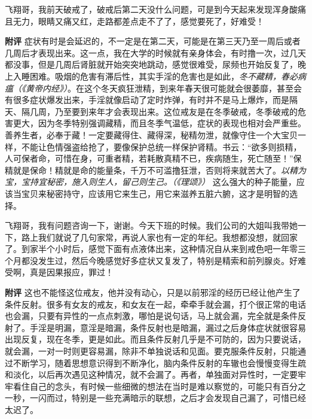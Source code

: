 \begin{case}
    飞翔哥，我前天破戒了，破戒后第二天没什么问题，可是到今天起来发现浑身酸痛且无力，眼睛又痛又红，走路都差点走不了了，感觉要死了，好难受！

    \textbf{附评} 症状有时是会延迟的，不一定是在第二天，可能是在第三天乃至一周后或者几周后才表现出来。这一点，我在大学的时候就有亲身体会，有时撸一次，过几天都没事，但是几周后肾脏就开始突突地跳动，感觉很难受，尿频也开始反复了，晚上入睡困难。吸烟的危害有滞后性，其实手淫的危害也是如此，\textit{冬不藏精，春必病瘟（《黄帝内经》）}。在这个冬天疯狂泄精，到来年春天很可能就会很萎靡，甚至会有很多症状爆发出来，手淫就像启动了定时炸弹，有时并不是马上爆炸，而是隔天、隔几周，乃至要到来年才会表现出来。这位戒友是在冬季破戒，冬季破戒的危害更大，因为冬季特别强调藏精，而且冬季气温低，症状的表现也相对会严重些。善养生者，必奉于藏！一定要藏得住、藏得深，秘精勿泄，就像守住一个大宝贝一样，不能让色情强盗给抢了，要像保护总统一样保护肾精。书云：“欲多则损精，人可保者命，可惜在身，可重者精，若耗散真精不已，疾病随生，死亡随至！”保精就是保命！精就是命的能量条，千万不可滥撸狂泄，否则将来就苦大了。\textit{以精为宝，宝持宜秘密，施入则生人，留己则生己。（《理颂》）} 这么强大的种子能量，应该当宝贝来秘密持守，应该用它来生己，用它来滋养五脏六腑，这才是明智的选择。
\end{case}

\begin{case}
    飞翔哥，我有问题咨询一下，谢谢。今天下班的时候。我们公司的大姐叫我带她一下，路上我们就说了几句家常，再说人家也有一定的年纪。我想都没想，就回家了。到家半个小时后，感觉下面有点液体出来，这种情况自从来到戒色吧一年零三个月都没发生过，然后今晚感觉好多症状又复发了，特别是精索和前列腺炎。好难受啊，真是因果报应，罪过！

    \textbf{附评} 这也不能怪这位戒友，他并没有动心，只是以前邪淫的经历已经让他产生了条件反射。很多有女友的戒友，和女友在一起，牵牵手就会漏，打个很正常的电话也会漏，只要有异性的一点点刺激，哪怕是说句话，马上就会漏，完全就是条件反射了。手淫是明漏，意淫是暗漏，条件反射也是暗漏，漏过之后身体症状就很容易出现反复，现在冬季，更是如此。而且条件反射几乎是不可防的，因为只要说话，就会漏，一对一时则更容易漏，除非不单独说话和见面。要克服条件反射，只能通过不断学习，随着思想意识得到不断净化，脑内条件反射的车辙也会慢慢变得生疏和淡化，以后再次遇见这种情况，就不会漏了。再者，单独面对异性时，一定要牢牢看住自己的念头，有时候一些细微的想法在当时是难以察觉的，可能只有百分之一秒，一闪而过，特别是一些充满暗示的联想，之后才会发现自己漏了，可惜已经太迟了。
\end{case}

